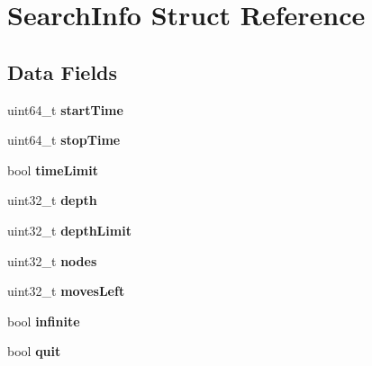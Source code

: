 \hypertarget{structSearchInfo}{}\section{Search\+Info Struct Reference}
\label{structSearchInfo}
\subsection*{Data Fields}
\begin{DoxyCompactItemize}
\item 
\mbox{\label{structSearchInfo_a6941b86fe82fed27ccb215058b1ebaca}} 
uint64\+\_\+t {\bfseries start\+Time}
\item 
\mbox{\label{structSearchInfo_a63783b4e0f5ce8ca6c879602f13f059c}} 
uint64\+\_\+t {\bfseries stop\+Time}
\item 
\mbox{\label{structSearchInfo_a59ba0ab42e54ce6a7802b9539cc83dd2}} 
bool {\bfseries time\+Limit}
\item 
\mbox{\label{structSearchInfo_af38c629d4cf4f3679011e5a29a52c86e}} 
uint32\+\_\+t {\bfseries depth}
\item 
\mbox{\label{structSearchInfo_a1086806af79fa252ac177bc758298df8}} 
uint32\+\_\+t {\bfseries depth\+Limit}
\item 
\mbox{\label{structSearchInfo_a06e212fc443a1d9544534a06640c8d5f}} 
uint32\+\_\+t {\bfseries nodes}
\item 
\mbox{\label{structSearchInfo_ae86581f2a80db0d11ff3f9e4c3f402ec}} 
uint32\+\_\+t {\bfseries moves\+Left}
\item 
\mbox{\label{structSearchInfo_afbf237162fbae5d667857d6edff2db8f}} 
bool {\bfseries infinite}
\item 
\mbox{\label{structSearchInfo_ae1437efa9afa50befedfa2b517e438c6}} 
bool {\bfseries quit}
\item 
\mbox{\label{structSearchInfo_afd8a3398b992f2fb4aad70bc0016c9de}} 

\end{DoxyCompactItemize}
